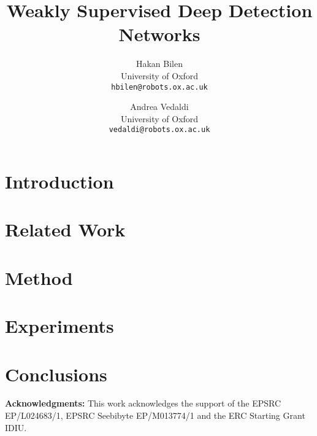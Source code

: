 \documentclass[10pt,twocolumn,letterpaper]{article}
\begin{document}


\title{Weakly Supervised Deep Detection Networks}
\author{Hakan Bilen\\
University of Oxford\\
{\tt\small hbilen@robots.ox.ac.uk}
\and
Andrea Vedaldi\\
University of Oxford\\
{\tt\small vedaldi@robots.ox.ac.uk}
}



\maketitle
\begin{abstract}

\end{abstract}

\section{Introduction}\label{s:intro}


\section{Related Work}\label{s:related}


\section{Method}\label{s:method}


\section{Experiments}\label{s:experiments}


\section{Conclusions}\label{s:conclusions}


{\small
\textbf{Acknowledgments:} This work acknowledges the support of the EPSRC EP/L024683/1, EPSRC Seebibyte EP/M013774/1 and the ERC Starting Grant IDIU. 
}

\clearpage
{
\small


% 
}
\end{document}

